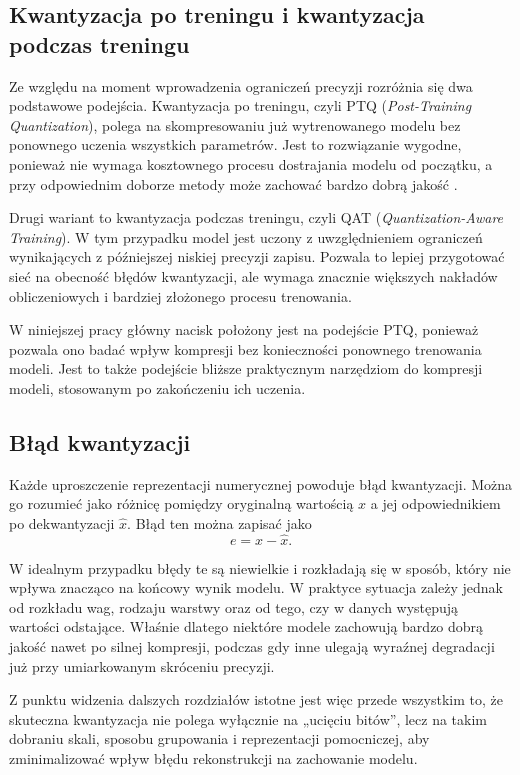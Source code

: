 \subsection{Kwantyzacja po treningu i kwantyzacja podczas treningu}

Ze względu na moment wprowadzenia ograniczeń precyzji rozróżnia się dwa podstawowe podejścia. Kwantyzacja po treningu, czyli PTQ (\textit{Post-Training Quantization}), polega na skompresowaniu już wytrenowanego modelu bez ponownego uczenia wszystkich parametrów. Jest to rozwiązanie wygodne, ponieważ nie wymaga kosztownego procesu dostrajania modelu od początku, a przy odpowiednim doborze metody może zachować bardzo dobrą jakość \cite{frantar2023gptq}.

Drugi wariant to kwantyzacja podczas treningu, czyli QAT (\textit{Quantization-Aware Training}). W tym przypadku model jest uczony z uwzględnieniem ograniczeń wynikających z późniejszej niskiej precyzji zapisu. Pozwala to lepiej przygotować sieć na obecność błędów kwantyzacji, ale wymaga znacznie większych nakładów obliczeniowych i bardziej złożonego procesu trenowania.

W niniejszej pracy główny nacisk położony jest na podejście PTQ, ponieważ pozwala ono badać wpływ kompresji bez konieczności ponownego trenowania modeli. Jest to także podejście bliższe praktycznym narzędziom do kompresji modeli, stosowanym po zakończeniu ich uczenia.

\subsection{Błąd kwantyzacji}

Każde uproszczenie reprezentacji numerycznej powoduje błąd kwantyzacji. Można go rozumieć jako różnicę pomiędzy oryginalną wartością $x$ a jej odpowiednikiem po dekwantyzacji $\hat{x}$. Błąd ten można zapisać jako
\begin{equation}
	e = x - \hat{x}.
\end{equation}

W idealnym przypadku błędy te są niewielkie i rozkładają się w sposób, który nie wpływa znacząco na końcowy wynik modelu. W praktyce sytuacja zależy jednak od rozkładu wag, rodzaju warstwy oraz od tego, czy w danych występują wartości odstające. Właśnie dlatego niektóre modele zachowują bardzo dobrą jakość nawet po silnej kompresji, podczas gdy inne ulegają wyraźnej degradacji już przy umiarkowanym skróceniu precyzji.

Z punktu widzenia dalszych rozdziałów istotne jest więc przede wszystkim to, że skuteczna kwantyzacja nie polega wyłącznie na „ucięciu bitów”, lecz na takim dobraniu skali, sposobu grupowania i reprezentacji pomocniczej, aby zminimalizować wpływ błędu rekonstrukcji na zachowanie modelu.

